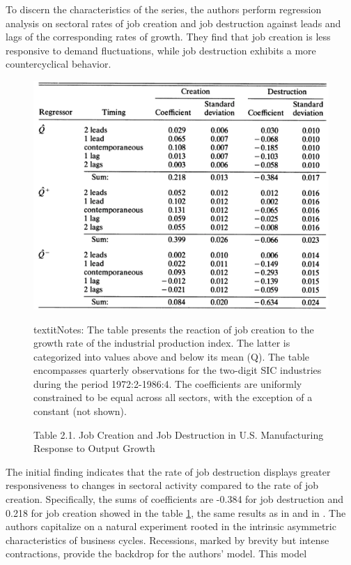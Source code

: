 \documentclass[12pt]{article}
\begin{document}
To discern the characteristics of the series, the authors perform regression analysis on sectoral rates of job creation
and job destruction against leads and lags of the corresponding rates of growth. They find that job creation is less
responsive to demand fluctuations, while job destruction exhibits a more countercyclical behavior. 
\begin{figure}
    \centering
    \includegraphics[scale = 0.4]{Plot2.3.png}
    \caption{Table 2.1. Job Creation and Job Destruction in U.S. Manufacturing Response to Output Growth}
    \label{Table 2.1.}
    \footnotesize textit{Notes}: The table presents the reaction of job creation to the growth rate of the industrial
    production index. The latter is categorized into values above and below its mean (Q). The table encompasses
    quarterly observations for the two-digit SIC industries during the period 1972:2-1986:4. The coefficients are
    uniformly constrained to be equal across all sectors, with the exception of a constant (not shown).  
\end{figure}
The initial finding indicates that the rate of job destruction displays greater responsiveness to changes in sectoral
activity compared to the rate of job creation. Specifically, the sums of coefficients are -0.384 for job destruction and
0.218 for job creation showed in the table \ref{Table 2.1.}, the same results as in \cite{DAvHalt90,DavHalt92} and in
\cite{BlaDia90}.
The authors capitalize on a natural experiment rooted in the intrinsic asymmetric characteristics of business cycles.
Recessions, marked by brevity but intense contractions, provide the backdrop for the authors' model. This model
\end{document}
